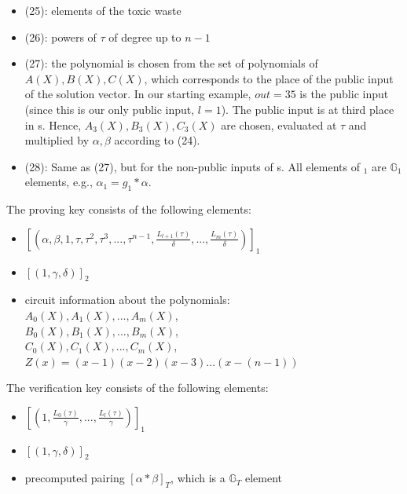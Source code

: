 \begin{itemize}
    \item (25): elements of the toxic waste
    \item (26): powers of \begin{math}\tau\end{math} of degree up to \(n-1\)
    \item (27): the polynomial is chosen from the set of polynomials of \(A(X), B(X), C(X)\), which corresponds to the place of the public input of the solution vector. In our starting example, \(out = 35\) is the public input (since this is our only public input, \(l=1\)). The public input is at third place in s. Hence, \(A_3(X), B_3(X), C_3(X)\) are chosen, evaluated at \begin{math}\tau\end{math} and multiplied by \begin{math} \alpha, \beta\end{math} according to (24).
    \item (28): Same as (27), but for the non-public inputs of s. All elements of \begin{math} [\sigma_1]_1 \end{math} are \begin{math}\mathbb{G}_1\end{math} elements, e.g., \begin{math}\alpha_1 = g_1 * \alpha\end{math}.
\end{itemize}

The proving key consists of the following elements:
\begin{itemize}
    \item \([(\alpha, \beta, 1, \tau, \tau^2, \tau^3, ..., \tau^{n-1}, \frac{L_{l+1}(\tau)}{\delta}, ..., \frac{L_m(\tau)}{\delta})]_1\)
    \item \([(1, \gamma, \delta)]_2\)
    \item circuit information about the polynomials: \\
    \(A_0(X), A_1(X), ..., A_m(X)\),\\
    \(B_0(X), B_1(X), ..., B_m(X)\),\\
    \(C_0(X), C_1(X), ..., C_m(X)\),\\
    \(Z(x) = (x-1)(x-2)(x-3)...(x-(n-1))\)\\
\end{itemize}

The verification key consists of the following elements:
\begin{itemize}
    \item \([(1, \frac{L_0(\tau)}{\gamma}, ..., \frac{L_l(\tau)}{\gamma})]_1\)
    \item \([(1, \gamma, \delta)]_2\)
    \item precomputed pairing \([\alpha * \beta]_T\), which is a \begin{math}\mathbb{G}_T\end{math} element
\end{itemize}

